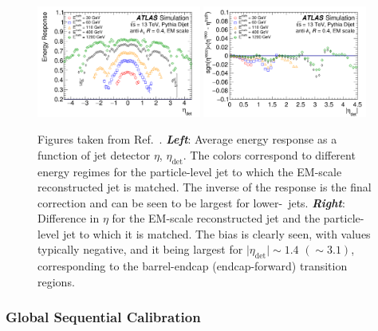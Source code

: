\begin{figure}[!htb]
    \begin{center}
        \includegraphics[width=0.48\textwidth]{figures/chapter3/jets/abs_jes_response}
        \includegraphics[width=0.48\textwidth]{figures/chapter3/jets/abs_jes_eta}
        \caption{
            Figures taken from Ref.~\cite{Aaboud:2017jcu}.
            \textbf{\textit{Left}}: Average energy response as a function of jet detector $\eta$, $\eta_{\text{det}}$.
            The colors correspond to different energy regimes for the particle-level jet to which the EM-scale
            reconstructed jet is matched. The inverse of the response is the final correction and can be seen to be
            largest for lower-\pT~jets.
            \textbf{\textit{Right}}: Difference in $\eta$ for the EM-scale reconstructed jet and the particle-level jet to which
            it is matched. The bias is clearly seen, with values typically negative, and it being largest
            for $\lvert \eta_{\text{det}} \rvert \sim 1.4$ $(\sim 3.1)$, corresponding to the barrel-endcap (endcap-forward)
            transition regions.
        }
        \label{fig:abs_jes_response}
    \end{center}
\end{figure}
\FloatBarrier

\subsubsection{Global Sequential Calibration}
\label{sec:jet_gsc}

